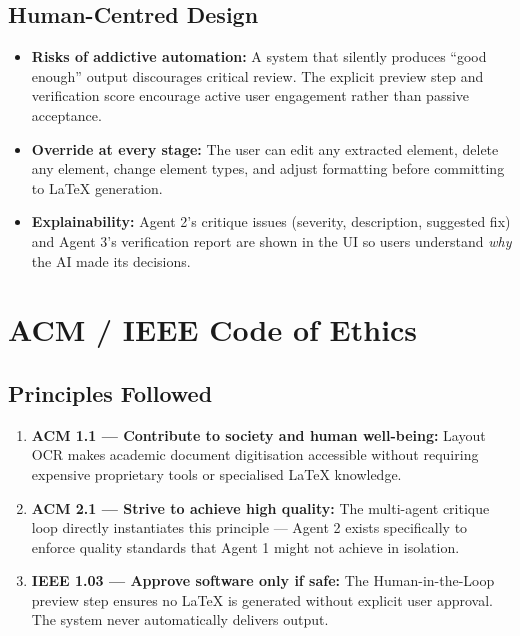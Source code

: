 \documentclass[12pt,a4paper]{article}
\begin{document}
\subsection{Human-Centred Design}
\begin{itemize}[noitemsep]
  \item \textbf{Risks of addictive automation:} A system that silently produces ``good enough''
    output discourages critical review. The explicit preview step and verification score
    encourage active user engagement rather than passive acceptance.
  \item \textbf{Override at every stage:} The user can edit any extracted element, delete any
    element, change element types, and adjust formatting before committing to LaTeX generation.
  \item \textbf{Explainability:} Agent 2's critique issues (severity, description, suggested fix)
    and Agent 3's verification report are shown in the UI so users understand \emph{why} the AI
    made its decisions.
\end{itemize}


\section{ACM / IEEE Code of Ethics}

\subsection{Principles Followed}

\begin{enumerate}[noitemsep]
  \item \textbf{ACM 1.1 — Contribute to society and human well-being:}
    Layout OCR makes academic document digitisation accessible without requiring expensive
    proprietary tools or specialised LaTeX knowledge.

  \item \textbf{ACM 2.1 — Strive to achieve high quality:}
    The multi-agent critique loop directly instantiates this principle — Agent 2 exists
    specifically to enforce quality standards that Agent 1 might not achieve in isolation.

  \item \textbf{IEEE 1.03 — Approve software only if safe:}
    The Human-in-the-Loop preview step ensures no LaTeX is generated without explicit user
    approval. The system never automatically delivers output.
\end{enumerate}
\end{document}
